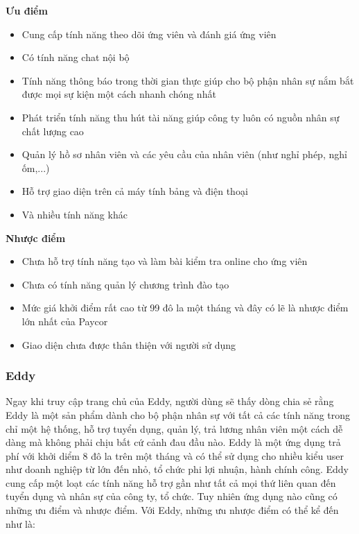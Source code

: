 \documentclass[../DoAn.tex]{subfiles}
\begin{document}
\textbf{Ưu điểm}
\begin{itemize}
    \item Cung cấp tính năng theo dõi ứng viên và đánh giá ứng viên
    \item Có tính năng chat nội bộ
    \item Tính năng thông báo trong thời gian thực giúp cho bộ phận nhân sự nắm bắt được mọi sự kiện một cách nhanh chóng nhất
    \item Phát triển tính năng thu hút tài năng giúp công ty luôn có nguồn nhân sự chất lượng cao
    \item Quản lý hồ sơ nhân viên và các yêu cầu của nhân viên (như nghỉ phép, nghỉ ốm,...)
    \item Hỗ trợ giao diện trên cả máy tính bảng và điện thoại
    \item Và nhiều tính năng khác
\end{itemize}

\textbf{Nhược điểm}
\begin{itemize}
    \item Chưa hỗ trợ tính năng tạo và làm bài kiểm tra online cho ứng viên
    \item Chưa có tính năng quản lý chương trình đào tạo
    \item Mức giá khởi điểm rất cao từ 99 đô la một tháng và đây có lẽ là nhược điểm lớn nhất của Paycor
    \item Giao diện chưa được thân thiện với người sử dụng
\end{itemize}

\subsubsection{Eddy}\cite{Eddy}
Ngay khi truy cập trang chủ của Eddy, người dùng sẽ thấy dòng chia sẻ rằng Eddy là một sản phẩm dành cho bộ phận nhân sự với tất cả các tính năng trong chỉ một hệ thống, hỗ trợ tuyển dụng, quản lý, trả lương nhân viên một cách dễ dàng mà không phải chịu bất cứ cảnh đau đầu nào. Eddy là một ứng dụng trả phí với khởi diểm 8 đô la trên một tháng và có thể sử dụng cho nhiều kiểu user như doanh nghiệp từ lớn đến nhỏ, tổ chức phi lợi nhuận, hành chính công. Eddy cung cấp một loạt các tính năng hỗ trợ gần như tất cả mọi thứ liên quan đến tuyển dụng và nhân sự của công ty, tổ chức. Tuy nhiên ứng dụng nào cũng có những ưu điểm và nhược điểm. Với Eddy, những ưu nhược điểm có thể kể đến như là:
\end{document}
